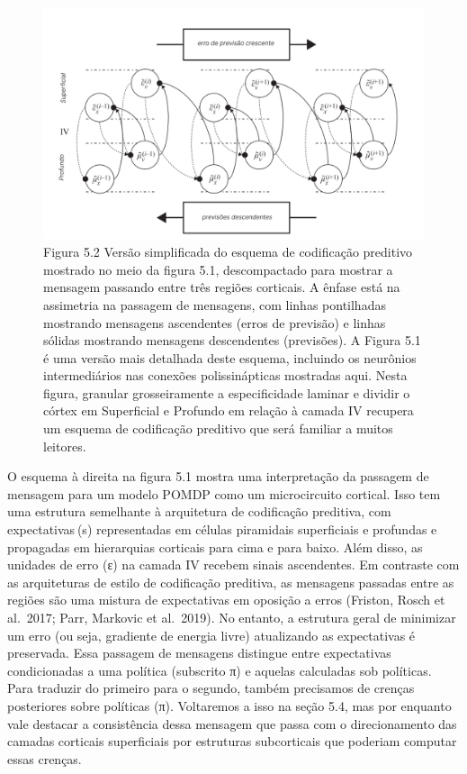 \documentclass[
  12pt,
]{book}
\begin{document}
\begin{figure}
\centering
\includegraphics{images/Figura_5_2.png}
\caption{Figura 5.2 Versão simplificada do esquema de codificação preditivo mostrado no meio da figura 5.1, descompactado para mostrar a mensagem passando entre três regiões corticais. A ênfase está na assimetria na passagem de mensagens, com linhas pontilhadas mostrando mensagens ascendentes (erros de previsão) e linhas sólidas mostrando mensagens descendentes (previsões). A Figura 5.1 é uma versão mais detalhada deste esquema, incluindo os neurônios intermediários nas conexões polissinápticas mostradas aqui. Nesta figura, granular grosseiramente a especificidade laminar e dividir o córtex em Superficial e Profundo em relação à camada IV recupera um esquema de codificação preditivo que será familiar a muitos leitores.}
\end{figure}

O esquema à direita na figura 5.1 mostra uma interpretação da passagem de mensagem para um modelo POMDP como um microcircuito cortical. Isso tem uma estrutura semelhante à arquitetura de codificação preditiva, com expectativas (s) representadas em células piramidais superficiais e profundas e propagadas em hierarquias corticais para cima e para baixo. Além disso, as unidades de erro (ε) na camada IV recebem sinais ascendentes. Em contraste com as arquiteturas de estilo de codificação preditiva, as mensagens passadas entre as regiões são uma mistura de expectativas em oposição a erros (Friston, Rosch et al.~2017; Parr, Markovic et al.~2019). No entanto, a estrutura geral de minimizar um erro (ou seja, gradiente de energia livre) atualizando as expectativas é preservada. Essa passagem de mensagens distingue entre expectativas condicionadas a uma política (subscrito π) e aquelas calculadas sob políticas. Para traduzir do primeiro para o segundo, também precisamos de crenças posteriores sobre políticas (π). Voltaremos a isso na seção 5.4, mas por enquanto vale destacar a consistência dessa mensagem que passa com o direcionamento das camadas corticais superficiais por estruturas subcorticais que poderiam computar essas crenças.
\end{document}
